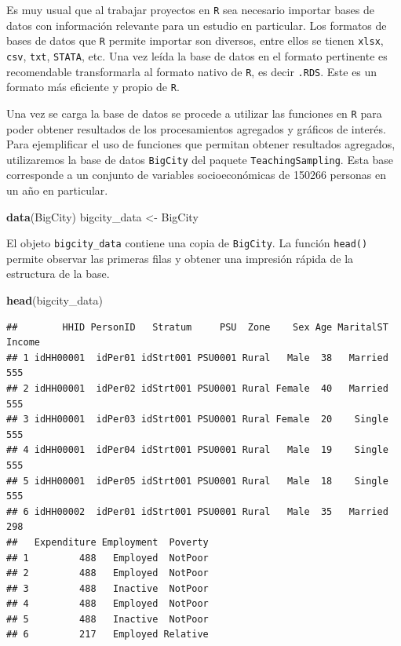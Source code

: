\documentclass[
  spanish,
  12pt,
]{book}
\newenvironment{Shaded}{\begin{snugshade}}{\end{snugshade}}
\newcommand{\FunctionTok}[1]{\textcolor[rgb]{0.13,0.29,0.53}{\textbf{#1}}}
\newcommand{\NormalTok}[1]{#1}
\newcommand{\OtherTok}[1]{\textcolor[rgb]{0.56,0.35,0.01}{#1}}
\begin{document}
Es muy usual que al trabajar proyectos en \texttt{R} sea necesario importar bases de datos con información relevante para un estudio en particular. Los formatos de bases de datos que \texttt{R} permite importar son diversos, entre ellos se tienen \texttt{xlsx}, \texttt{csv}, \texttt{txt}, \texttt{STATA}, etc. Una vez leída la base de datos en el formato pertinente es recomendable transformarla al formato nativo de \texttt{R}, es decir \texttt{.RDS}. Este es un formato más eficiente y propio de \texttt{R}.

Una vez se carga la base de datos se procede a utilizar las funciones en \texttt{R} para poder obtener resultados de los procesamientos agregados y gráficos de interés. Para ejemplificar el uso de funciones que permitan obtener resultados agregados, utilizaremos la base de datos \texttt{BigCity} del paquete \texttt{TeachingSampling}. Esta base corresponde a un conjunto de variables socioeconómicas de 150266 personas en un año en particular.

\begin{Shaded}
\begin{Highlighting}[]
\FunctionTok{data}\NormalTok{(BigCity)}
\NormalTok{bigcity\_data }\OtherTok{\textless{}{-}}\NormalTok{ BigCity}
\end{Highlighting}
\end{Shaded}

El objeto \texttt{bigcity\_data} contiene una copia de \texttt{BigCity}. La función \texttt{head()} permite observar las primeras filas y obtener una impresión rápida de la estructura de la base.

\begin{Shaded}
\begin{Highlighting}[]
\FunctionTok{head}\NormalTok{(bigcity\_data)}
\end{Highlighting}
\end{Shaded}

\begin{verbatim}
##        HHID PersonID   Stratum     PSU  Zone    Sex Age MaritalST Income
## 1 idHH00001  idPer01 idStrt001 PSU0001 Rural   Male  38   Married    555
## 2 idHH00001  idPer02 idStrt001 PSU0001 Rural Female  40   Married    555
## 3 idHH00001  idPer03 idStrt001 PSU0001 Rural Female  20    Single    555
## 4 idHH00001  idPer04 idStrt001 PSU0001 Rural   Male  19    Single    555
## 5 idHH00001  idPer05 idStrt001 PSU0001 Rural   Male  18    Single    555
## 6 idHH00002  idPer01 idStrt001 PSU0001 Rural   Male  35   Married    298
##   Expenditure Employment  Poverty
## 1         488   Employed  NotPoor
## 2         488   Employed  NotPoor
## 3         488   Inactive  NotPoor
## 4         488   Employed  NotPoor
## 5         488   Inactive  NotPoor
## 6         217   Employed Relative
\end{verbatim}
\end{document}
